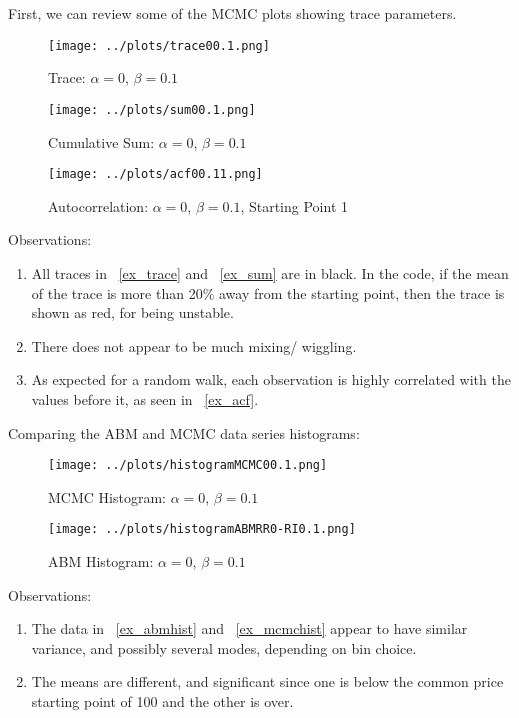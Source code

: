 \documentclass[a4paper, 11pt]{report}
\begin{document}
First, we can review some of the MCMC plots showing trace parameters.

\begin{figure}[h!] 
\caption{Trace: $\alpha = 0$, $\beta=0.1$}
\label{ex_trace}
\texttt{[image: ../plots/trace00.1.png]} 
\end{figure}

\begin{figure}[h!] 
\caption{Cumulative Sum: $\alpha = 0$, $\beta=0.1$}
\label{ex_sum}
 \texttt{[image: ../plots/sum00.1.png]} 
\end{figure}

\begin{figure}[h!] 
\caption{Autocorrelation: $\alpha = 0$, $\beta=0.1$, Starting Point 1}
\label{ex_acf}
 \texttt{[image: ../plots/acf00.11.png]} 
\end{figure}

\noindent Observations:
\begin{enumerate}
\item All traces in ~\autoref{ex_trace} and ~\autoref{ex_sum} are in black. In the code, if the mean of the trace is more than 20\% away from the starting point, then the trace is shown as red, for being unstable. 
\item There does not appear to be much mixing/ wiggling.
\item As expected for a random walk, each observation is highly correlated with the values before it, as seen in ~\autoref{ex_acf}.
\end{enumerate}

\noindent Comparing the ABM and MCMC data series histograms:

\begin{figure}[h!] 
\caption{MCMC Histogram: $\alpha = 0$, $\beta=0.1$ }
\label{ex_mcmchist}
 \texttt{[image: ../plots/histogramMCMC00.1.png]} 
\end{figure}

\begin{figure}[h!] \caption{ABM Histogram: $\alpha = 0$, $\beta=0.1$ }
\label{ex_abmhist} \texttt{[image: ../plots/histogramABMRR0-RI0.1.png]} 
\end{figure}

\noindent Observations:
\begin{enumerate}
\item The data in ~\autoref{ex_abmhist} and ~\autoref{ex_mcmchist} appear to have similar variance, and possibly several modes, depending on bin choice.
\item The means are different, and significant since one is below the common price starting point of 100 and the other is over.
\end{enumerate}
\end{document}
